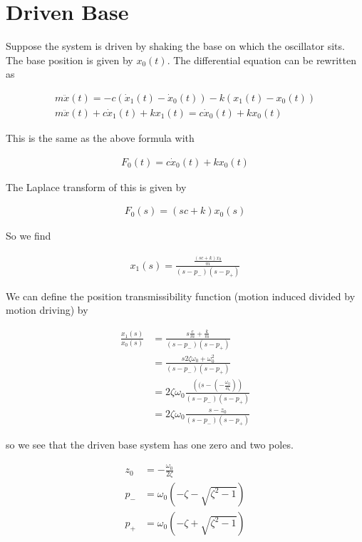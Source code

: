 \documentclass[12pt]{article}
\begin{document}
\section{Driven Base}

Suppose the system is driven by shaking the base on which the oscillator sits. The base position is given by $x_0(t)$. The differential equation can be rewritten as

\begin{align}
m \ddot{x}(t) = -c(\dot{x}_1(t) - \dot{x}_0(t)) - k(x_1(t)-x_0(t))\\
m\ddot{x}(t) + c\dot{x}_1(t) + kx_1(t) = c \dot{x}_0(t) + k x_0(t)
\end{align} 

This is the same as the above formula with

\begin{align}
F_0(t) = c \dot{x}_0(t) + k x_0(t)
\end{align}

The Laplace transform of this is given by

\begin{align}
F_0(s) = (sc + k)x_0(s)
\end{align}

So we find

\begin{align}
x_1(s) = \frac{\frac{(sc + k)x_0}{m}}{(s-p_-)(s-p_+)}
\end{align}

We can define the position transmissibility function (motion induced divided by motion driving) by

\begin{align}
\frac{x_1(s)}{x_0(s)} &= \frac{s \frac{c}{m} + \frac{k}{m}}{(s-p_-)(s-p_+)}\\
&= \frac{s2\zeta \omega_0 + \omega_0^2}{(s-p_-)(s-p_+)}\\
&= 2 \zeta \omega_0 \frac{\left((s - \left(-\frac{\omega_0}{2 \zeta}\right)\right)}{(s-p_-)(s-p_+)}\\
&= 2\zeta \omega_0 \frac{s-z_0}{(s-p_-)(s-p_+)}
\end{align}

so we see that the driven base system has one zero and two poles.

\begin{align}
z_0 &= -\frac{\omega_0}{2\zeta}\\
p_- &= \omega_0(-\zeta - \sqrt{\zeta^2 -1})\\
p_+ &= \omega_0(-\zeta + \sqrt{\zeta^2-1})
\end{align}
\end{document}
